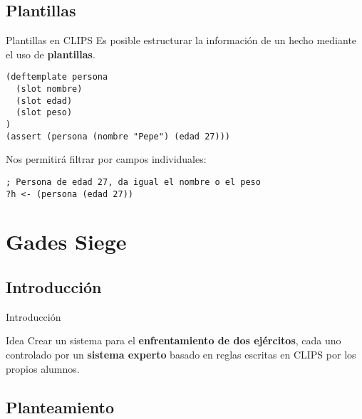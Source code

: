 \documentclass[smaller,spanish,xcolor=svgnames]{beamer}
\begin{document}
\subsection{Plantillas}

\begin{frame}[fragile]{Plantillas en CLIPS}
  Es posible estructurar la información de un hecho mediante el uso de
  \textbf{plantillas}.

\begin{verbatim}
(deftemplate persona
  (slot nombre)
  (slot edad)
  (slot peso)
)
(assert (persona (nombre "Pepe") (edad 27)))
\end{verbatim}

Nos permitirá filtrar por campos individuales:

\begin{verbatim}
; Persona de edad 27, da igual el nombre o el peso
?h <- (persona (edad 27))
\end{verbatim}
  
\end{frame}
\section{Gades Siege}

\subsection{Introducción}

\begin{frame}{Introducción}
  \begin{block}{Idea}
    Crear un sistema para el \textbf{enfrentamiento de dos ejércitos}, cada uno
    controlado por un \textbf{sistema experto} basado en reglas escritas en
    CLIPS por los propios alumnos.
  \end{block}

\end{frame}

\subsection{Planteamiento}
\end{document}
